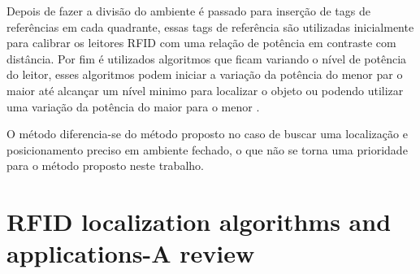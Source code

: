 \par
Depois de fazer a divisão do ambiente é passado para inserção de tags de referências em cada quadrante, essas tags de referência são utilizadas inicialmente para calibrar os leitores RFID com uma relação de potência em contraste com distância. Por fim é utilizados algoritmos que ficam variando o nível de potência do leitor, esses algoritmos podem iniciar a variação da potência do menor par o maior até alcançar um nível minimo para localizar o objeto ou podendo utilizar uma variação da potência do maior para o menor \citeauthor{localization2010}.

\par
O método \citeauthor{localization2010} diferencia-se do método proposto no caso de buscar uma localização e posicionamento preciso em ambiente fechado, o que não se torna uma prioridade para o método proposto neste trabalho.
\section{RFID localization algorithms and applications-A review}